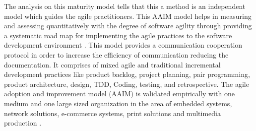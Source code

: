 \documentclass[a4paper,oneside]{bth}
\begin{document}
The analysis on this maturity model tells that this a method is an independent model which guides the agile practitioners. This AAIM model helps in measuring and assessing quantitatively with the degree of software agility through providing a systematic road map for implementing the agile practices to the software development environment \cite{qumer_framework_2008}. This model provides a communication cooperation protocol in order to increase the efficiency of communication reducing the documentation. It comprises of mixed agile and traditional incremental development practices like product backlog, project planning, pair programming, product architecture, design, TDD, Coding, testing, and retrospective. The agile adoption and improvement model (AAIM) is validated empirically with one medium and one large sized organization in the area of embedded systems, network solutions, e-commerce systems, print solutions and multimedia production \cite{qumer_framework_2008}.
\end{document}
